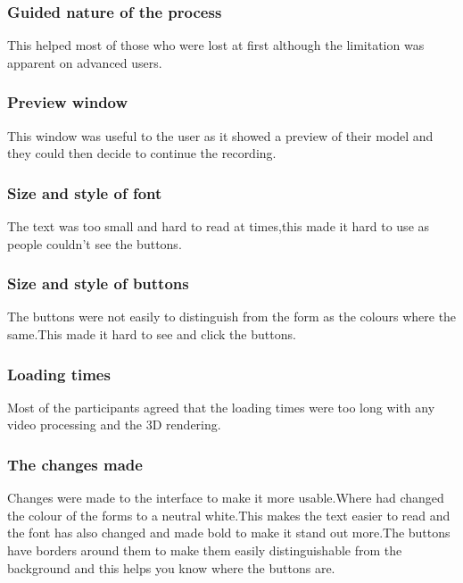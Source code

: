 \subsubsection{Guided nature of the process}
This helped most of those who were lost at first although the limitation was apparent on advanced users.

\subsubsection{Preview window}
This window was useful to the user as it showed a preview of their model and they could then decide to continue the recording.

\subsubsection{Size and style of font}
The text was too small and hard to read at times,this made it hard to use as people couldn't see the buttons.

\subsubsection{Size and style of buttons}
The buttons were not easily to distinguish from the form as the colours where the same.This made it hard to see and click the buttons.

\subsubsection{Loading times}
Most of the participants agreed that the loading times were too long with any video processing and the 3D rendering.

\subsubsection{The changes made}
Changes were made to the interface to make it more usable.Where had changed the colour of the forms to a neutral white.This makes the text easier to read and the font has also changed and made bold to make it stand out more.The buttons have borders around them to make them easily distinguishable from the background and this helps you know where the buttons are.
